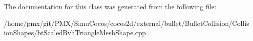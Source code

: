 The documentation for this class was generated from the following file\+:\begin{DoxyCompactItemize}
\item 
/home/pmx/git/\+P\+M\+X/\+Simu\+Cocos/cocos2d/external/bullet/\+Bullet\+Collision/\+Collision\+Shapes/bt\+Scaled\+Bvh\+Triangle\+Mesh\+Shape.\+cpp\end{DoxyCompactItemize}
